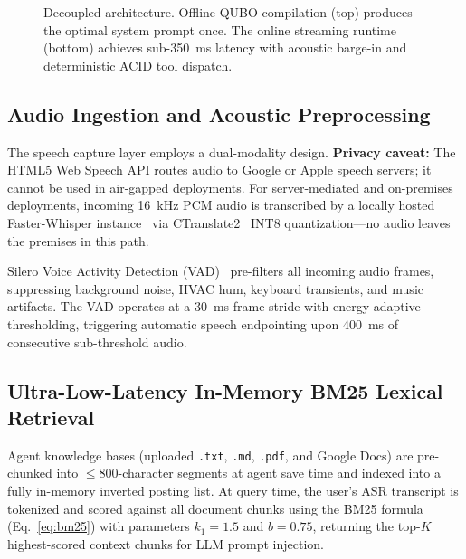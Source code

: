 \documentclass[11pt,a4paper]{article}
\begin{document}
\begin{figure}[htbp]
\caption{Decoupled architecture. Offline QUBO compilation (top) produces the optimal system prompt once. The online streaming runtime (bottom) achieves sub-350~ms latency with acoustic barge-in and deterministic ACID tool dispatch.}
\label{fig:sys_arch}
\end{figure}

\subsection{Audio Ingestion and Acoustic Preprocessing}
\label{subsec:audio_ingestion}

The speech capture layer employs a dual-modality design. \textbf{Privacy caveat:} The HTML5 Web Speech API routes audio to Google or Apple speech servers; it cannot be used in air-gapped deployments. For server-mediated and on-premises deployments, incoming 16~kHz PCM audio is transcribed by a locally hosted Faster-Whisper instance~\cite{fasterwhisper2023} via CTranslate2~\cite{kleymyuk2021ctranslate2} INT8 quantization---no audio leaves the premises in this path.

Silero Voice Activity Detection (VAD)~\cite{silero2021vad} pre-filters all incoming audio frames, suppressing background noise, HVAC hum, keyboard transients, and music artifacts. The VAD operates at a $30$~ms frame stride with energy-adaptive thresholding, triggering automatic speech endpointing upon $400$~ms of consecutive sub-threshold audio.

\subsection{Ultra-Low-Latency In-Memory BM25 Lexical Retrieval}
\label{subsec:bm25}

Agent knowledge bases (uploaded \texttt{.txt}, \texttt{.md}, \texttt{.pdf}, and Google Docs) are pre-chunked into $\le 800$-character segments at agent save time and indexed into a fully in-memory inverted posting list. At query time, the user's ASR transcript is tokenized and scored against all document chunks using the BM25 formula (Eq.~\ref{eq:bm25}) with parameters $k_1 = 1.5$ and $b = 0.75$, returning the top-$K$ highest-scored context chunks for LLM prompt injection.
\end{document}
